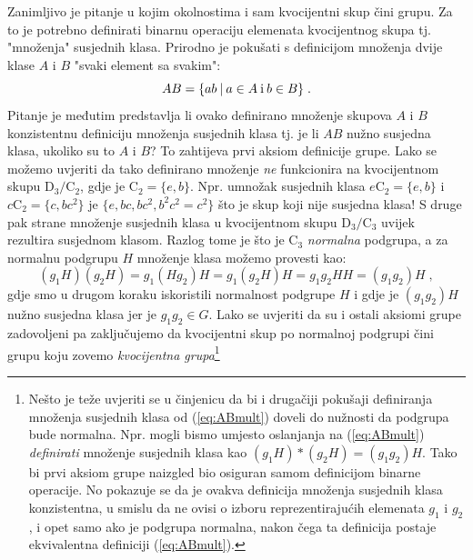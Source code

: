 Zanimljivo je pitanje u kojim okolnostima i sam kvocijentni skup čini grupu.
Za to je potrebno definirati binarnu operaciju elemenata kvocijentnog
skupa tj. "množenja" susjednih klasa.
Prirodno je pokušati s definicijom množenja dvije klase $A$ i 
$B$ "svaki element sa svakim":
\begin{equation}\label{eq:ABmult}
    A B =\{ab \: | \: a \in A \:\text{i}\: b \in B\} \;.
\end{equation}
Pitanje je međutim predstavlja li ovako definirano množenje skupova $A$ i $B$
konzistentnu definiciju množenja susjednih klasa tj. je li $AB$ nužno susjedna
klasa, ukoliko su to $A$ i $B$? To zahtijeva prvi aksiom definicije
grupe. Lako se možemo uvjeriti da tako definirano množenje \emph{ne} funkcionira
na kvocijentnom skupu $\mathrm{D}_3 / \mathrm{C}_2$, gdje je $\mathrm{C}_2 = \{e, b\}$.
Npr. umnožak susjednih klasa $e\mathrm{C}_2 = \{e, b\}$ i $c\mathrm{C}_2=\{c, bc^2\}$
je $\{e, bc, bc^2, b^2 c^2 = c^2\}$ što je skup koji nije susjedna klasa!
S druge pak strane množenje susjednih klasa u kvocijentnom skupu
$\mathrm{D}_3 / \mathrm{C}_3$ uvijek rezultira susjednom klasom. Razlog tome je
što je $\mathrm{C}_3$ \emph{normalna} podgrupa, a za normalnu podgrupu $H$ 
množenje klasa možemo provesti kao:
\begin{equation}
       (g_1H)(g_2H) = g_1 (H g_2) H = g_1 (g_2 H) H = g_1 g_2 H H
       = (g_1 g_2) H\;,
\end{equation}
gdje smo u drugom koraku iskoristili normalnost podgrupe $H$ i gdje je
$(g_1 g_2) H$ nužno susjedna klasa jer je $g_1 g_2 \in G$.
Lako se uvjeriti da su i ostali aksiomi grupe zadovoljeni pa zaključujemo
da kvocijentni skup po normalnoj podgrupi čini grupu koju zovemo
 
\emph{kvocijentna grupa}\footnote{Nešto je teže
    uvjeriti se u činjenicu da bi i drugačiji pokušaji definiranja množenja
    susjednih klasa od (\ref{eq:ABmult}) doveli do nužnosti da podgrupa
bude normalna. Npr. mogli bismo umjesto oslanjanja na (\ref{eq:ABmult}) 
\emph{definirati} množenje susjednih klasa kao $(g_1 H) \ast (g_2 H) = (g_1 g_2) H$.
Tako bi prvi aksiom grupe naizgled bio osiguran samom definicijom binarne operacije.
No pokazuje se da je ovakva definicija množenja susjednih klasa konzistentna, u smislu
da ne ovisi o izboru reprezentirajućih elemenata $g_1$ i $g_2$, i opet samo ako je
podgrupa normalna, nakon čega ta definicija postaje ekvivalentna definiciji (\ref{eq:ABmult}).}


